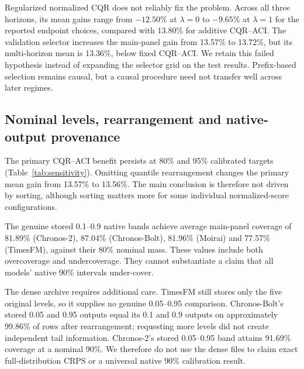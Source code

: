 Regularized normalized CQR does not reliably fix the problem. Across all three horizons,
its mean gains range from $-12.50\%$ at $\lambda=0$ to $-9.65\%$ at $\lambda=1$ for the
reported endpoint choices, compared with 13.80\% for additive CQR--ACI. The validation
selector increases the main-panel gain from 13.57\% to 13.72\%, but its multi-horizon
mean is 13.36\%, below fixed CQR--ACI. We retain this failed hypothesis instead of
expanding the selector grid on the test results. Prefix-based selection remains causal,
but a causal procedure need not transfer well across later regimes.

\subsection{Nominal levels, rearrangement and native-output provenance}
The primary CQR--ACI benefit persists at 80\% and 95\% calibrated targets
(Table~\ref{tab:sensitivity}). Omitting quantile rearrangement changes the primary mean
gain from 13.57\% to 13.56\%. The main conclusion is therefore not driven by sorting,
although sorting matters more for some individual normalized-score configurations.

\begin{table}[htbp]\centering\small
\caption{CQR--ACI sensitivity, using default residual--ACI at the same nominal level as
the denominator. Dense archives are a repeated-output sensitivity, not new independent data.}
\label{tab:sensitivity}
\end{table}

The genuine stored 0.1--0.9 native bands achieve average main-panel coverage of 81.89\%
(Chronos-2), 87.04\% (Chronos-Bolt), 81.96\% (Moirai) and 77.57\% (TimesFM), against
their 80\% nominal mass. These values include both overcoverage and undercoverage.
They cannot substantiate a claim that all models' native 90\% intervals under-cover.

The dense archive requires additional care. TimesFM still stores only the five original
levels, so it supplies no genuine 0.05--0.95 comparison. Chronos-Bolt's stored 0.05 and
0.95 outputs equal its 0.1 and 0.9 outputs on approximately 99.86\% of rows after
rearrangement; requesting more levels did not create independent tail information.
Chronos-2's stored 0.05--0.95 band attains 91.69\% coverage at a nominal 90\%.
We therefore do not use the dense files to claim exact full-distribution CRPS or a
universal native 90\% calibration result.

